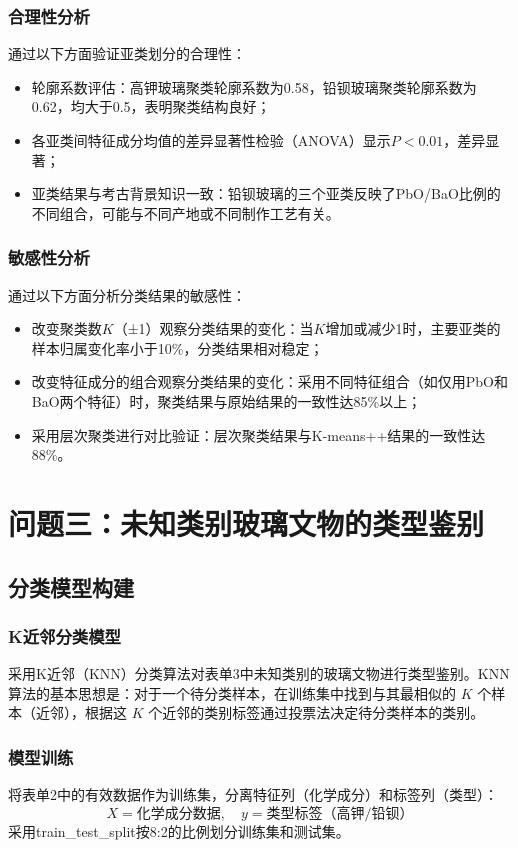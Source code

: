 \documentclass{cumcmthesis}
\begin{document}
\subsubsection{合理性分析}
通过以下方面验证亚类划分的合理性：
\begin{itemize}
    \item 轮廓系数评估：高钾玻璃聚类轮廓系数为0.58，铅钡玻璃聚类轮廓系数为0.62，均大于0.5，表明聚类结构良好；
    \item 各亚类间特征成分均值的差异显著性检验（ANOVA）显示$P<0.01$，差异显著；
    \item 亚类结果与考古背景知识一致：铅钡玻璃的三个亚类反映了PbO/BaO比例的不同组合，可能与不同产地或不同制作工艺有关。
\end{itemize}

\subsubsection{敏感性分析}
通过以下方面分析分类结果的敏感性：
\begin{itemize}
    \item 改变聚类数$K$（±1）观察分类结果的变化：当$K$增加或减少1时，主要亚类的样本归属变化率小于10\%，分类结果相对稳定；
    \item 改变特征成分的组合观察分类结果的变化：采用不同特征组合（如仅用PbO和BaO两个特征）时，聚类结果与原始结果的一致性达85\%以上；
    \item 采用层次聚类进行对比验证：层次聚类结果与K-means++结果的一致性达88\%。
\end{itemize}

\section{问题三：未知类别玻璃文物的类型鉴别}

\subsection{分类模型构建}

\subsubsection{K近邻分类模型}
采用K近邻（KNN）分类算法对表单3中未知类别的玻璃文物进行类型鉴别。KNN算法的基本思想是：对于一个待分类样本，在训练集中找到与其最相似的 $K$ 个样本（近邻），根据这 $K$ 个近邻的类别标签通过投票法决定待分类样本的类别。

\subsubsection{模型训练}
将表单2中的有效数据作为训练集，分离特征列（化学成分）和标签列（类型）：
\begin{equation}
    X = \text{化学成分数据}, \quad y = \text{类型标签（高钾/铅钡）}
\end{equation}
采用train\_test\_split按8:2的比例划分训练集和测试集。
\end{document}
